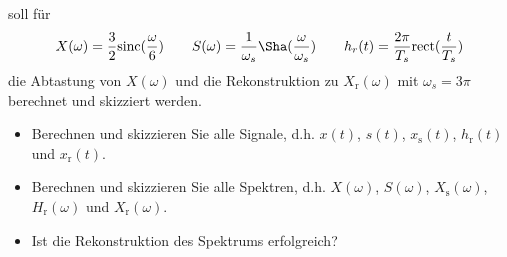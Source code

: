 soll für
\begin{align}
X(\omega) = \frac{3}{2}\mathrm{sinc}(\frac{\omega}{6})\qquad
%
S(\omega)=\frac{1}{\omega_s}\Sha(\frac{\omega}{\omega_s})\qquad
%
h_r(t) = \frac{2\pi}{T_s}\mathrm{rect}(\frac{t}{T_s})
\end{align}
die Abtastung von $X(\omega)$ und die Rekonstruktion zu $X_\mathrm{r}(\omega)$
mit $\omega_s = 3 \pi$ berechnet und skizziert werden.

\begin{itemize}
  \item Berechnen und skizzieren Sie alle Signale, d.h. $x(t)$, $s(t)$, $x_\mathrm{s}(t)$, $h_\mathrm{r}(t)$ und $x_\mathrm{r}(t)$.
  \item Berechnen und skizzieren Sie alle Spektren, d.h.  $X(\omega)$, $S(\omega)$, $X_\mathrm{s}(\omega)$, $H_\mathrm{r}(\omega)$ und $X_\mathrm{r}(\omega)$.
  \item Ist die Rekonstruktion des Spektrums erfolgreich?
\end{itemize}

